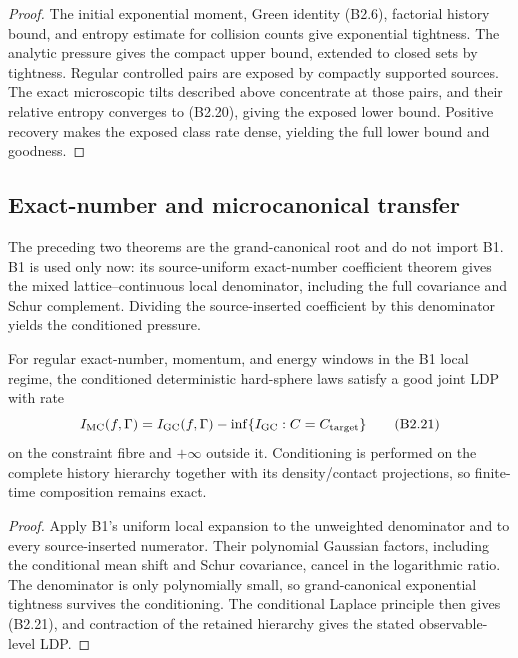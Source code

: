 \begin{proof}
The initial exponential moment, Green identity (B2.6), factorial history
bound, and entropy estimate for collision counts give exponential tightness.
The analytic pressure gives the compact upper bound, extended to closed sets
by tightness.  Regular controlled pairs are exposed by compactly supported
sources.  The exact microscopic tilts described above concentrate at those
pairs, and their relative entropy converges to (B2.20), giving the exposed
lower bound.  Positive recovery makes the exposed class rate dense, yielding
the full lower bound and goodness.
\end{proof}

\subsection{Exact-number and microcanonical transfer}

The preceding two theorems are the grand-canonical root and do not import B1.
B1 is used only now: its source-uniform exact-number coefficient theorem gives
the mixed lattice--continuous local denominator, including the full covariance
and Schur complement.  Dividing the source-inserted coefficient by this
denominator yields the conditioned pressure.

\begin{theorem}
\label{thm:r23-b2-mc}
For regular exact-number, momentum, and energy windows in the B1 local regime,
the conditioned deterministic hard-sphere laws satisfy a good joint LDP with
rate
\[
 I_{\rm MC}(f,\Gamma)
 =I_{\rm GC}(f,\Gamma)
  -\inf\{I_{\rm GC}:C=C_{\rm target}\}                  \tag{B2.21}
\]
on the constraint fibre and $+\infty$ outside it.  Conditioning is performed
on the complete history hierarchy together with its density/contact
projections, so finite-time composition remains exact.
\end{theorem}

\begin{proof}
Apply B1's uniform local expansion to the unweighted denominator and to every
source-inserted numerator.  Their polynomial Gaussian factors, including the
conditional mean shift and Schur covariance, cancel in the logarithmic ratio.
The denominator is only polynomially small, so grand-canonical exponential
tightness survives the conditioning.  The conditional Laplace principle then
gives (B2.21), and contraction of the retained hierarchy gives the stated
observable-level LDP.
\end{proof}

